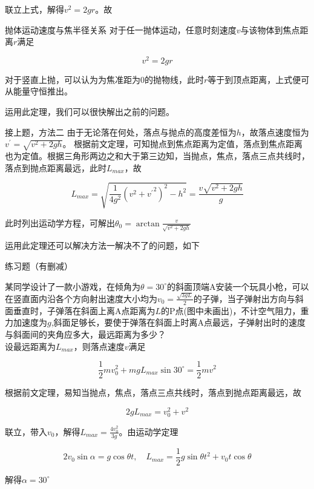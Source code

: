 联立上式，解得$v^2 = 2gr$。故

\begin{theo}{抛体运动速度与焦半径关系}{}
对于任一抛体运动，任意时刻速度$v$与该物体到焦点距离$r$满足

$$v^2 = 2gr$$

\end{theo}

对于竖直上抛，可以认为为焦准距为$0$的抛物线，此时$r$等于到顶点距离，上式便可从能量守恒推出。

运用此定理，我们可以很快解出之前的问题。

\begin{ep}{接上题，方法二}{}
由于无论落在何处，落点与抛点的高度差恒为$h$，故落点速度恒为$v^{\prime} = \sqrt{v^2 + 2gh}$。
根据前文定理，可知抛点到焦点距离为定值，落点到焦点距离也为定值。根据三角形两边之和大于第三边知，当抛点，焦点，落点三点共线时，落点到抛点距离最远，此时$L_{max}$，故

$$L_{max} = \sqrt{\frac{1}{4g^2} (v^2 + {v^{\prime}}^2)^2 - h^2} = \frac{v\sqrt{v^2 + 2gh}}{g}$$

此时列出运动学方程，可解出$\theta_0 = \arctan{\frac{v}{\sqrt{v^2 + 2gh}}}$
\end{ep}

运用此定理还可以解决方法一解决不了的问题，如下

\begin{ep}{练习题（有删减）}{}



某同学设计了一款小游戏，在倾角为$\theta = 30^{\circ}$的斜面顶端A安装一个玩具小枪，可以在竖直面内沿各个方向射出速度大小均为$v_0 = \frac{\sqrt{3gL}}{2}$的子弹，当子弹射出方向与斜面垂直时，子弹落在斜面上离A点距离为$L$的P点(图中未画出)，不计空气阻力，重力加速度为$g$,斜面足够长，要使于弹落在斜面上时离A点最远，子弹射出时的速度与斜面间的夹角应多大，最远距离为多少？
~\\

设最远距离为$L_{max}$，则落点速度$v$满足

$$\frac{1}{2} m v_0^2 + mgL_{max} \sin 30^{\circ} = \frac{1}{2} m v^2$$

根据前文定理，易知当抛点，焦点，落点三点共线时，落点到抛点距离最远，故

$$2gL_{max} = v_0^2 + v^2$$

联立，带入$v_0$，解得$L_{max} = \frac{4 v_0^2}{3g}$。由运动学定理

$$2 v_0 \sin \alpha = g \cos \theta t ,\quad L_{max} = \frac{1}{2} g \sin \theta t^2 + v_0 t \cos \theta$$

解得$\alpha = 30^{\circ}$

\end{ep}

